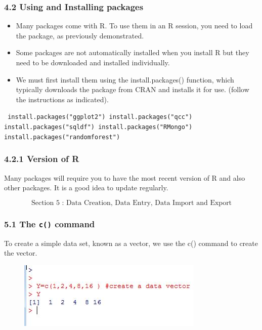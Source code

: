 \documentclass{beamer}
\begin{document}
 	\begin{frame}
 		\frametitle{4.2 Using and Installing packages}
 		\begin{itemize}
 			\item Many packages come with R. To use them in an R session, you need to load the package, as
 			previously demonstrated.
 			\item Some packages are not automatically installed when you install R but they need to be downloaded
 			and installed individually. 
 			\item We must first install them using the install.packages()
 			function, which typically downloads the package from CRAN and installs it for use. (follow the
 			instructions as indicated).
 		\end{itemize}
 	\end{frame}
 	\begin{frame}
 		\texttt{
 			install.packages("ggplot2")
 			install.packages("qcc")
 			install.packages("sqldf")
 			install.packages("RMongo")
 			install.packages("randomforest")}
 		
 	\end{frame}
 	\begin{frame}
 		\frametitle{4.2.1 Version of R}
 		Many packages will require you to have the most recent version of R and also other packages.
 		It is a good idea to update regularly.
 	\end{frame}
 	\begin{frame}
 		\[\mbox{Section 5 : Data Creation, Data Entry, Data Import and Export}\]
 	\end{frame}
 	\begin{frame}
 		\frametitle{5.1 The \texttt{c()} command}
 		To create a simple data set, known as a vector, we use the c() command to create the vector.
 		\begin{figure}
 			\centering
 			\includegraphics[width=0.7\linewidth]{images/makevector1}
 			\caption{}
 			\label{fig:makevector1}
 		\end{figure}
 		
 		
 	\end{frame}
\end{document}
